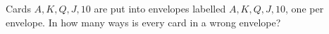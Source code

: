 Cards $A,K,Q,J,10$ are put into envelopes labelled $A,K,Q,J,10$, one per envelope. In how many ways is every card in a wrong envelope?
